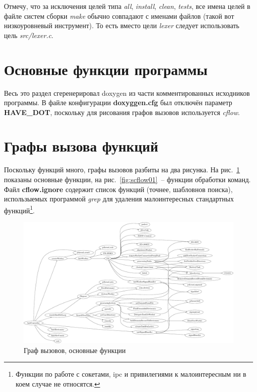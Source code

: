 \documentclass[a4paper,12pt]{report}
\begin{document}
Отмечу, что за исключения целей типа \textit{all}, \textit{install}, \textit{clean}, \textit{tests}, все имена целей в файле систем сборки \textit{make} обычно совпадают с именами файлов (такой вот низкоуровневый инструмент). То есть вместо цели \textit{lexer} следует использовать цель \textit{src/lexer.c}.

\section{Основные функции программы}

Весь это раздел сгеренерировал doxygen из части комментированных исходников программы. В файле конфигурации \textbf{doxyggen.cfg} был отключён параметр \textbf{HAVE\_DOT}, поскольку для рисования графов вызовов используется \textit{cflow}.

% 

% 
% 
% 
% 
% 
% 
% 
% 
% 
% 


\section{Графы вызова функций}

Поскольку функций много, графы вызовов разбиты на два рисунка. На рис.~\ref{fig:ccflow01} показаны основные функции, на рис.~\ref{fig:scflow01}~-- функции обработки команд. Файл \textbf{cflow.ignore} содержит список функций (точнее, шабловнов поиска), использыемых программой \textit{grep} для удаления малоинтересных стандартных функций\footnote{Функции по работе с сокетами, ipc и привилегиями к малоинтересным ни в коем случае не относятся.}.

\begin{figure}
\centering
\includegraphics[width=\textwidth]{include/ccflow01_dot.pdf}
\caption{Граф вызовов, основные функции}
\label{fig:ccflow01}
\end{figure}
\end{document}
